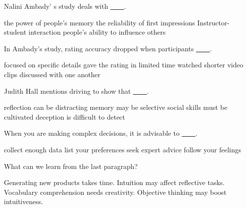 \item Nalini Ambady' s study deals with \uline{~~~~}.
\begin{tasks}
	\task the power of people's memory
	\task the reliability of first impressions
	\task Instructor-student interaction
	\task people's ability to influence others
\end{tasks}
\item In Ambady's study, rating accuracy dropped when participants \uline{~~~~}.
\begin{tasks}
	\task focused on specific details
	\task gave the rating in limited time
	\task watched shorter video clips
	\task discussed with one another
\end{tasks}
\item Judith Hall mentions driving to show that \uline{~~~~}.
\begin{tasks}
	\task reflection can be distracting
	\task memory may be selective
	\task social skills must be cultivated
	\task deception is difficult to detect
\end{tasks}
\item When you are making complex decisions, it is advisable to \uline{~~~~}.
\begin{tasks}
	\task collect enough data
	\task list your preferences
	\task seek expert advice
	\task follow your feelings
\end{tasks}
\item What can we learn from the last paragraph?
\begin{tasks}
	\task Generating new products takes time.
	\task Intuition may affect reflective tasks.
	\task Vocabulary comprehension needs creativity.
	\task Objective thinking may boost intuitiveness.
\end{tasks}